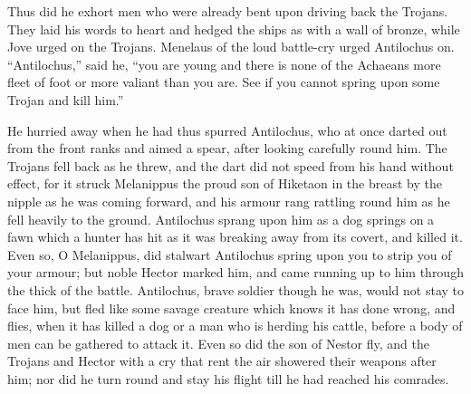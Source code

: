 Thus did he exhort men who were already bent upon driving back the
Trojans. They laid his words to heart and hedged the ships as with a wall
of bronze, while Jove urged on the Trojans. Menelaus of the loud
battle-cry urged Antilochus on. “Antilochus,” said he, “you are young and
there is none of the Achaeans more fleet of foot or more valiant than you
are. See if you cannot spring upon some Trojan and kill him.”

He hurried away when he had thus spurred Antilochus, who at once darted
out from the front ranks and aimed a spear, after looking carefully round
him. The Trojans fell back as he threw, and the dart did not speed from
his hand without effect, for it struck Melanippus the proud son of
Hiketaon in the breast by the nipple as he was coming forward, and his
armour rang rattling round him as he fell heavily to the ground.
Antilochus sprang upon him as a dog springs on a fawn which a hunter has
hit as it was breaking away from its covert, and killed it. Even so, O
Melanippus, did stalwart Antilochus spring upon you to strip you of your
armour; but noble Hector marked him, and came running up to him through
the thick of the battle. Antilochus, brave soldier though he was, would
not stay to face him, but fled like some savage creature which knows it
has done wrong, and flies, when it has killed a dog or a man who is
herding his cattle, before a body of men can be gathered to attack it.
Even so did the son of Nestor fly, and the Trojans and Hector with a cry
that rent the air showered their weapons after him; nor did he turn round
and stay his flight till he had reached his comrades.

